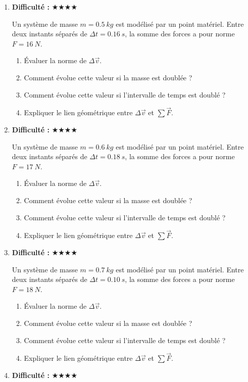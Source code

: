 \documentclass[11pt,a4paper]{article}
\newcommand{\etoiles}[1]{\textbf{Difficulté : }#1}
\begin{document}
\begin{enumerate}[label=\textbf{Exercice \arabic*.},leftmargin=*]
Un système de masse $m=0.4\ \si{kg}$ est modélisé par un point matériel.
Entre deux instants séparés de $\Delta t=0.14\ \si{s}$, la somme des forces a pour norme $F=15\ \si{N}$.
\begin{enumerate}[label=\alph*)]
\item Évaluer la norme de $\Delta \vec v$.
\item Comment évolue cette valeur si la masse est doublée ?
\item Comment évolue cette valeur si l'intervalle de temps est doublé ?
\item Expliquer le lien géométrique entre $\Delta\vec v$ et $\sum \vec F$.
\end{enumerate}
\item \etoiles{★★★★}

Un système de masse $m=0.5\ \si{kg}$ est modélisé par un point matériel.
Entre deux instants séparés de $\Delta t=0.16\ \si{s}$, la somme des forces a pour norme $F=16\ \si{N}$.
\begin{enumerate}[label=\alph*)]
\item Évaluer la norme de $\Delta \vec v$.
\item Comment évolue cette valeur si la masse est doublée ?
\item Comment évolue cette valeur si l'intervalle de temps est doublé ?
\item Expliquer le lien géométrique entre $\Delta\vec v$ et $\sum \vec F$.
\end{enumerate}
\item \etoiles{★★★★}

Un système de masse $m=0.6\ \si{kg}$ est modélisé par un point matériel.
Entre deux instants séparés de $\Delta t=0.18\ \si{s}$, la somme des forces a pour norme $F=17\ \si{N}$.
\begin{enumerate}[label=\alph*)]
\item Évaluer la norme de $\Delta \vec v$.
\item Comment évolue cette valeur si la masse est doublée ?
\item Comment évolue cette valeur si l'intervalle de temps est doublé ?
\item Expliquer le lien géométrique entre $\Delta\vec v$ et $\sum \vec F$.
\end{enumerate}
\item \etoiles{★★★★}

Un système de masse $m=0.7\ \si{kg}$ est modélisé par un point matériel.
Entre deux instants séparés de $\Delta t=0.10\ \si{s}$, la somme des forces a pour norme $F=18\ \si{N}$.
\begin{enumerate}[label=\alph*)]
\item Évaluer la norme de $\Delta \vec v$.
\item Comment évolue cette valeur si la masse est doublée ?
\item Comment évolue cette valeur si l'intervalle de temps est doublé ?
\item Expliquer le lien géométrique entre $\Delta\vec v$ et $\sum \vec F$.
\end{enumerate}
\item \etoiles{★★★★}


\end{enumerate}
\end{document}
